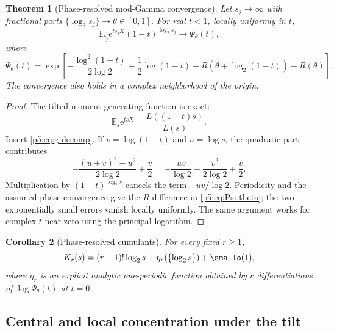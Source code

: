 \documentclass[11pt]{article}
\numberwithin{equation}{section}
\newtheorem{theorem}{Theorem}[section]
\newtheorem{corollary}[theorem]{Corollary}
\theoremstyle{definition}
\theoremstyle{remark}
\newcommand{\E}{\mathbb E}
\newcommand{\e}{\mathrm e}
\begin{document}
\begin{theorem}[Phase-resolved mod-Gamma convergence]\label{p5:thm:mod-gamma}
Let $s_j\to\infty$ with fractional parts
$\{\log_2s_j\}\to\theta\in[0,1]$.  For real $t<1$, locally uniformly in $t$,
\begin{equation}\label{p5:eq:mod-gamma}
 \boxed{
 \E_{s_j}\e^{t s_jX}(1-t)^{\log_2s_j}
 \longrightarrow\Psi_\theta(t),}
\end{equation}
where
\begin{equation}\label{p5:eq:Psi-theta}
 \boxed{
 \Psi_\theta(t)=\exp\!\left[
 -\frac{\log^2(1-t)}{2\log2}+\frac12\log(1-t)
 +R\!\left(\theta+\log_2(1-t)\right)-R(\theta)
 \right].}
\end{equation}
The convergence also holds in a complex neighborhood of the origin.
\end{theorem}

\begin{proof}
The tilted moment generating function is exact:
\begin{equation}\label{p5:eq:tilted-mgf-ratio}
 \E_s\e^{tsX}=\frac{L((1-t)s)}{L(s)}.
\end{equation}
Insert \cref{p5:eq:g-decomp}.  If $v=\log(1-t)$ and $u=\log s$, the quadratic
part contributes
\[
 -\frac{(u+v)^2-u^2}{2\log2}+\frac v2
 =-\frac{uv}{\log2}-\frac{v^2}{2\log2}+\frac v2.
\]
Multiplication by $(1-t)^{\log_2s}$ cancels the term $-uv/\log2$.  Periodicity
and the assumed phase convergence give the $R$-difference in
\cref{p5:eq:Psi-theta}; the two exponentially small errors vanish locally
uniformly.  The same argument works for complex $t$ near zero using the
principal logarithm.
\end{proof}

\begin{corollary}[Phase-resolved cumulants]\label{p5:cor:tilted-cumulants}
For every fixed $r\ge1$,
\begin{equation}\label{p5:eq:Kr-asymp}
 K_r(s)=(r-1)!\log_2s+
 \eta_r(\{\log_2s\})+\smallo(1),
\end{equation}
where $\eta_r$ is an explicit analytic one-periodic function obtained by
$r$ differentiations of $\log\Psi_\theta(t)$ at $t=0$.
\end{corollary}

\subsection{Central and local concentration under the tilt}
\end{document}
